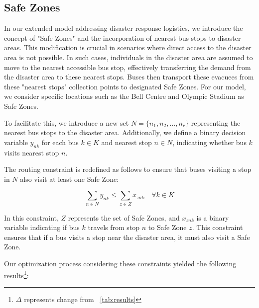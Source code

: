 \documentclass[12pt]{article}
\begin{document}
\subsection{Safe Zones}

In our extended model addressing disaster response logistics, we introduce the concept of "Safe Zones" and the incorporation of nearest bus stops to disaster areas. This modification is crucial in scenarios where direct access to the disaster area is not possible. In such cases, individuals in the disaster area are assumed to move to the nearest accessible bus stop, effectively transferring the demand from the disaster area to these nearest stops. Buses then transport these evacuees from these "nearest stops" collection points to designated Safe Zones. For our model, we consider specific locations such as the Bell Centre and Olympic Stadium as Safe Zones.

To facilitate this, we introduce a new set $N = \{n_1, n_2, \ldots, n_r\}$ representing the nearest bus stops to the disaster area. Additionally, we define a binary decision variable $y_{nk}$ for each bus $k \in K$ and nearest stop $n \in N$, indicating whether bus $k$ visits nearest stop $n$.

The routing constraint is redefined as follows to ensure that buses visiting a stop in $N$ also visit at least one Safe Zone:

$$
    \sum_{n \in N} y_{nk} \leq \sum_{z \in Z} x_{znk} \quad \forall k \in K
$$

In this constraint, $Z$ represents the set of Safe Zones, and $x_{znk}$ is a binary variable indicating if bus $k$ travels from stop $n$ to Safe Zone $z$. This constraint ensures that if a bus visits a stop near the disaster area, it must also visit a Safe Zone.

Our optimization process considering these constraints yielded the following results\footnote{$\Delta$ represents change from ~\autoref{tab:results}}:
\end{document}
